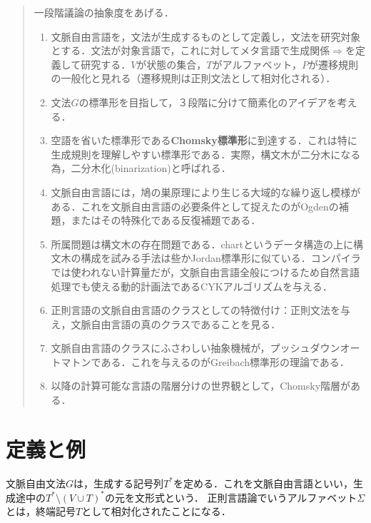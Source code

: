 \begin{quotation}
    一段階議論の抽象度をあげる．
    \begin{enumerate}
        \item 文脈自由言語を，文法が生成するものとして定義し，文法を研究対象とする．文法が対象言語で，これに対してメタ言語で生成関係$\Rightarrow$を定義して研究する．$V$が状態の集合，$T$がアルファベット，$P$が遷移規則の一般化と見れる（遷移規則は正則文法として相対化される）．
        \item 文法$G$の標準形を目指して，３段階に分けて簡素化のアイデアを考える．
        \item 空語を省いた標準形である\textbf{Chomsky標準形}に到達する．これは特に生成規則を理解しやすい標準形である．実際，構文木が二分木になる為，二分木化(binarization)と呼ばれる．
        \item 文脈自由言語には，鳩の巣原理により生じる大域的な繰り返し模様がある．これを文脈自由言語の必要条件として捉えたのがOgdenの補題，またはその特殊化である反復補題である．
        \item 所属問題は構文木の存在問題である．chartというデータ構造の上に構文木の構成を試みる手法は些かJordan標準形に似ている．コンパイラでは使われない計算量だが，文脈自由言語全般につけるため自然言語処理でも使える動的計画法であるCYKアルゴリズムを与える．
        \item 正則言語の文脈自由言語のクラスとしての特徴付け：正則文法を与え，文脈自由言語の真のクラスであることを見る．
        \item 文脈自由言語のクラスにふさわしい抽象機械が，プッシュダウンオートマトンである．これを与えるのがGreibach標準形の理論である．
        \item 以降の計算可能な言語の階層分けの世界観として，Chomsky階層がある．
    \end{enumerate}
\end{quotation}

\section{定義と例}

\begin{tcolorbox}[colframe=ForestGreen, colback=ForestGreen!10!white, breakable]
    文脈自由文法$G$は，生成する記号列$T^*$を定める．これを文脈自由言語といい，生成途中の$T^*\setminus(V\cup T)^*$の元を文形式という．
    正則言語論でいうアルファベット$\Sigma$とは，終端記号$T$として相対化されたことになる．
\end{tcolorbox}

